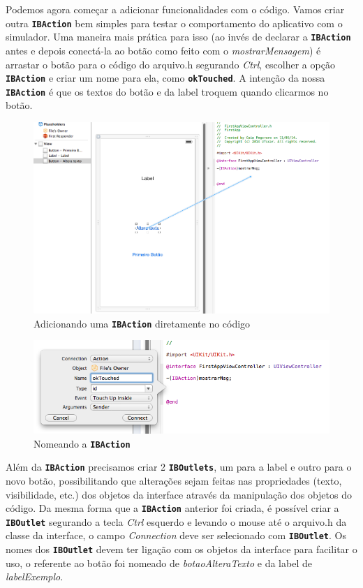 \documentclass[a4paper,12pt,brazil,doubleside]{book}
\begin{document}
\begin{singlespace}
Podemos agora começar a adicionar funcionalidades com o código. Vamos criar outra \texttt{\textbf{IBAction}} bem simples para testar o comportamento do aplicativo com o simulador. Uma maneira mais prática para isso (ao invés de declarar a \texttt{\textbf{IBAction}} antes e depois conectá-la ao botão como feito com o \emph{mostrarMensagem}) é arrastar o botão para o código do arquivo.h segurando \emph{Ctrl}, escolher a opção \texttt{\textbf{IBAction}} e criar um nome para ela, como \texttt{\textbf{okTouched}}. A intenção da nossa \texttt{\textbf{IBAction}} é que os textos do botão e da label troquem quando clicarmos no botão.

\begin{figure}[H]
  \centering
  \includegraphics[width=.99\textwidth]{figuras/3/tela_novo_projeto_27.png}
  \caption{Adicionando uma \texttt{\textbf{IBAction}} diretamente no código}
  \label{fig:a}
\end{figure}

\begin{figure}[H]
  \centering
  \includegraphics[width=.75\textwidth]{figuras/3/tela_novo_projeto_28.png}
  \caption{Nomeando a \texttt{\textbf{IBAction}}}
  \label{fig:a}
\end{figure}


Além da \texttt{\textbf{IBAction}} precisamos criar 2 \texttt{\textbf{IBOutlets}}, um para a label e outro para o novo botão, possibilitando que alterações sejam feitas nas propriedades (texto, visibilidade, etc.) dos objetos da interface através da manipulação dos objetos do código.
Da mesma forma que a \texttt{\textbf{IBAction}} anterior foi criada, é possível criar a \texttt{\textbf{IBOutlet}} segurando a tecla \emph{Ctrl} esquerdo e levando o mouse até o arquivo.h da classe da interface, o campo \emph{Connection} deve ser selecionado com \texttt{\textbf{IBOutlet}}.
Os nomes dos  \texttt{\textbf{IBOutlet}} devem ter ligação com os objetos da interface para facilitar o uso, o referente ao botão foi nomeado de \emph{botaoAlteraTexto} e da label de \emph{labelExemplo}.


\end{singlespace}
\end{document}
